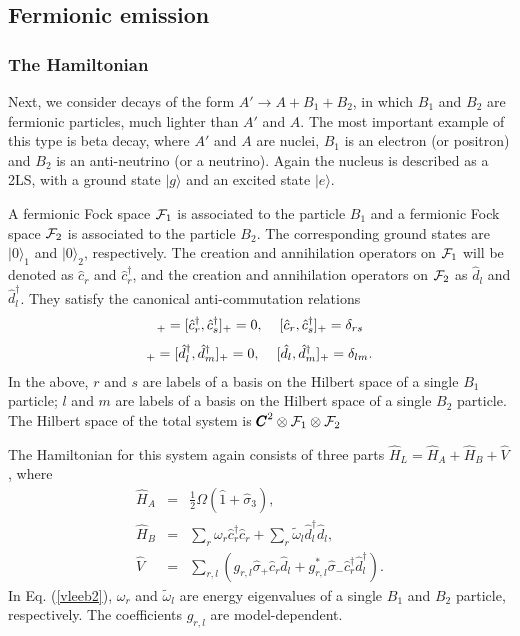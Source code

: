 \documentclass[12pt]{article}
\numberwithin{equation}{section}
\begin{document}
\subsection{Fermionic emission}
\subsubsection{The Hamiltonian}
Next, we consider decays of the form $A' \rightarrow A + B_1 + B_2$, in which   $B_1$ and $B_2$ are fermionic particles, much lighter than $A'$ and $A$. The most important example of this type is beta decay, where $A'$ and $A$ are nuclei, $B_1$ is an electron (or positron) and $B_2$ is an anti-neutrino (or a neutrino). Again the nucleus is described as a 2LS, with a ground state $|g \rangle$ and an excited state $|e\rangle$.

A fermionic Fock space ${\cal F}_1$ is associated to the  particle $B_1$ and a fermionic Fock space ${\cal F}_2$ is associated to the particle $B_2$. The corresponding ground states are $|0\rangle_1$ and $|0 \rangle_2$, respectively. The creation and annihilation operators on ${\cal F}_1$ will be denoted as $\hat{c}_{r}$ and $\hat{c}_{r}^{\dagger}$, and the creation and annihilation operators  on ${\cal F}_2$ as $\hat{d}_{l}$ and $\hat{d}_{l}^{\dagger}$. They satisfy the canonical anti-commutation relations
\begin{eqnarray}
[\hat{c}_r, \hat{c}_s]_+ = [\hat{c}_r^{\dagger}, \hat{c}^{\dagger}_s]_+ = 0, \hspace{0.4cm} [\hat{c}_r, \hat{c}^{\dagger}_s]_+ = \delta_{rs}
\end{eqnarray}
\begin{eqnarray}
[\hat{d}_l, \hat{d}_m]_+ = [\hat{d}_l^{\dagger}, \hat{d}^{\dagger}_m]_+ = 0, \hspace{0.4cm} [\hat{d}_l, \hat{d}^{\dagger}_m]_+ = \delta_{lm}.
\end{eqnarray}
In the above, $r$ and $s$ are labels of a basis on the Hilbert space of a single $B_1$ particle;  $l$ and $m$   are labels of a basis on the Hilbert space of a single $B_2$ particle. The Hilbert space of the total system is  ${\pmb C}^2 \otimes {\cal F}_1 \otimes {\cal F}_2$

The Hamiltonian for this system again consists of three parts $\hat{H}_L = \hat{H}_A + \hat{H}_B + \hat{V}$, where
\begin{eqnarray}
\hat{H}_A &=& \frac{1}{2} \Omega (\hat{1} + \hat{\sigma}_3)  , \label{vleeb1}\\
\hat{H}_B &=&   \sum_r \omega_r \hat{c}^{\dagger}_r \hat{c}_r   +     \sum_r \tilde{\omega}_l \hat{d}^{\dagger}_l \hat{d}_l  , \label{vleeb2}\\
\hat{V} &=& \sum_{r,l} \left(g_{r,l} \hat{\sigma}_+   \hat{c}_r   \hat{d}_l + g_{r,l}^*  \hat{\sigma}_-   \hat{c}_r^{\dagger}  \hat{d}_l^{\dagger} \right). \label{vleeb3}
\end{eqnarray}
In Eq. (\ref{vleeb2}), $\omega_r$ and $\tilde{\omega}_l$ are energy eigenvalues of a single $B_1$ and $B_2$ particle, respectively. The coefficients $g_{r, l}$ are model-dependent.
\end{document}
